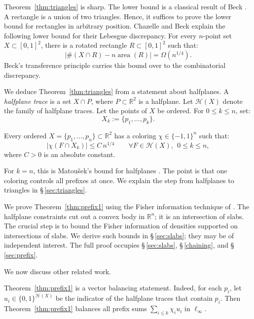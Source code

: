 \documentclass[12pt,reqno]{amsart}
\numberwithin{equation}{section}
\def \R {\mathbb{R}}
\begin{document}
Theorem~\ref{thm:triangles} is sharp. The lower bound is a classical result of Beck \cite{Beck-2}. A rectangle is a union of two triangles. Hence, it suffices to prove the lower bound for rectangles in arbitrary position. Chazelle \cite[\S\,3.2]{Chaz} and Beck \cite{Beck-2} explain the following lower bound for their Lebesgue discrepancy. For every \(n\)-point set \(X\subset[0,1]^2\), there is a rotated rectangle \(R\subset[0,1]^2\) such that:
\[
\bigl|\#(X\cap R)-n\operatorname{area}(R)\bigr|=\Omega(n^{1/4}).
\]
Beck's transference principle \cite{Beck-1} carries this bound over to the combinatorial discrepancy.
\smallskip%

We deduce Theorem~\ref{thm:triangles} from a statement about halfplanes. A \emph{halfplane trace} is a set \(X\cap P\), where \(P\subset\R^2\) is a halfplane. Let \(\mathcal H(X)\) denote the family of halfplane traces. Let the points of \(X\) be ordered. For \(0\le k\le n\), set:
\[
X_k:=\{p_1,\ldots,p_k\}.
\]
\begin{theorem}\label{thm:prefix1}
Every ordered \(X=\{p_1,\ldots,p_n\}\subset\R^2\) has a coloring \(\chi\in\{-1,1\}^n\) such that:
\[
|\chi(F\cap X_k)|\le C\,n^{1/4}\qquad\forall F\in\mathcal H(X),\ \ 0\le k\le n,
\]
where \(C>0\) is an absolute constant.
\end{theorem}
For \(k=n\), this is Matou\v{s}ek's bound for halfplanes \cite{Mat-halfspaces}. The point is that one coloring controls all prefixes at once. We explain the step from halfplanes to triangles in \S\,\ref{sec:triangles}.
\smallskip%

We prove Theorem~\ref{thm:prefix1} using the Fisher information technique of \cite{Versh-Sm-3, Versh-Sm-4}. The halfplane constraints cut out a convex body in \(\R^n\); it is an intersection of slabs. The crucial step is to bound the Fisher information of densities supported on intersections of slabs. We derive such bounds in \S\,\ref{sec:slabs}; they may be of independent interest. The full proof occupies \S\,\ref{sec:slabs}, \S\,\ref{chaining}, and \S\,\ref{sec:prefix}.
\smallskip%

We now discuss other related work.
\smallskip%

Theorem~\ref{thm:prefix1} is a vector balancing statement. Indeed, for each \(p_i\), let \(u_i\in\{0,1\}^{\mathcal H(X)}\) be the indicator of the halfplane traces that contain \(p_i\). Then Theorem~\ref{thm:prefix1} balances all prefix sums \(\sum_{i\le k}\chi_iu_i\) in \(\ell_\infty\).
\smallskip%
\end{document}
